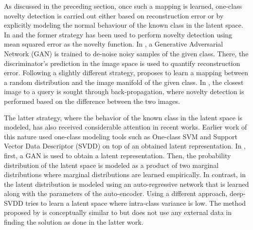 \documentclass[10pt,twocolumn,letterpaper]{article}
\begin{document}
As discussed in the preceding section, once such a mapping is learned, one-class novelty detection is carried out either based on reconstruction error or by explicitly modeling the normal behaviour of the known class in the latent space. In \cite{HOFFMANN2007863} and \cite{AE} the former strategy has been used to perform novelty detection using mean squared error as the novelty function. In \cite{cvpr2018}, a Generative Adversarial Network (GAN) \cite{goodfellow2014generative}  is trained to de-noise noisy samples of the given class. There, the discriminator's prediction in the image space is used to quantify reconstruction error. Following a slightly different strategy, \cite{IPMI} proposes to learn a mapping between a random distribution and the image manifold of the given class. In \cite{IPMI}, the closest image to a query is sought through back-propagation, where novelty detection is performed based on the difference between the two images.

The latter strategy, where the behavior of the known class in the latent space is modeled, has also received considerable attention in recent works. Earlier work of this nature used one-class modeling tools such as One-class SVM \cite{Scholkopf:2001:ESH:1119748.1119749} and Support Vector Data Descriptor (SVDD) \cite{Tax:2004:SVD:960091.960109} on top of an obtained latent representation. In \cite{GPND}, first, a GAN is used to obtain a latent representation. Then, the probability distribution of the latent space is modeled as a product of two marginal distributions where marginal distributions are learned empirically. In contrast, in \cite{AND} the latent distribution is modeled using an auto-regressive network that is learned along with the parameters of the auto-encoder. Using a different approach, deep-SVDD \cite{dsvdd} tries to learn a latent space where intra-class variance is low. The method proposed by \cite{dsvdd} is conceptually similar to \cite{ocfeatures} but does not use any external data in finding the solution as done in the latter work.
\end{document}
